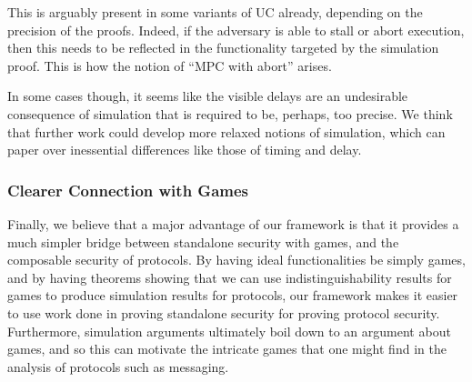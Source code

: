 This is arguably present in some variants of UC already,
depending on the precision of the proofs.
Indeed, if the adversary is able to stall or abort execution,
then this needs to be reflected in the functionality
targeted by the simulation proof.
This is how the notion of ``MPC with abort'' arises.

In some cases though, it seems like the visible
delays are an undesirable consequence of simulation that
is required to be, perhaps, too precise.
We think that further work could develop more relaxed notions of simulation,
which can paper over inessential differences like those of timing and delay.

\subsubsection*{Clearer Connection with Games}

Finally, we believe that a major advantage of our framework is that
it provides a much simpler bridge between standalone security
with games, and the composable security of protocols.
By having ideal functionalities be simply games,
and by having theorems showing that
we can use indistinguishability results for games to produce
simulation results for protocols,
our framework makes it easier to use work done in proving
standalone security for proving protocol security.
Furthermore, simulation arguments ultimately boil down
to an argument about games, and so this can motivate the
intricate games that one might find in the analysis of protocols
such as messaging.
